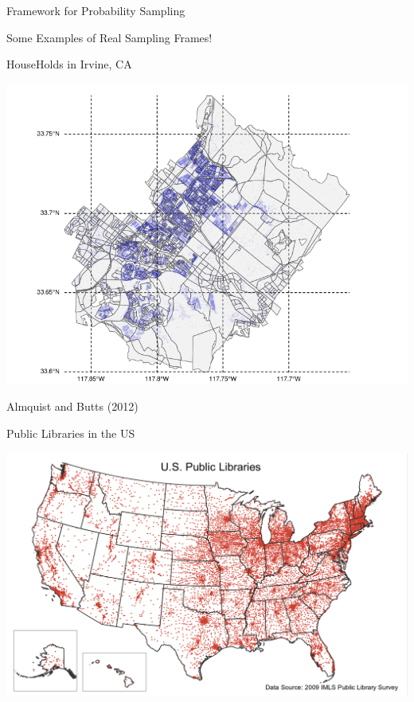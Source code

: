 \documentclass[10pt]{beamer}\usepackage[]{graphicx}\usepackage[]{xcolor}
\begin{document}
\begin{frame}{Framework for Probability Sampling}
\begin{block}{}
\begin{center}
Some Examples of Real Sampling Frames!
\end{center}
\end{block}
\end{frame}


\begin{frame}[containsverbatim]{HouseHolds in Irvine, CA}
\begin{center}
\includegraphics[width=.75\linewidth]{figures/irvineBLK.png}

{\footnotesize Almquist and Butts (2012)}
\end{center}
\end{frame}

\begin{frame}[containsverbatim]{Public Libraries in the US}
\begin{center}
\includegraphics[width=.8\linewidth]{figures/publibs_2009.png}
\end{center}
\end{frame}
\end{document}
